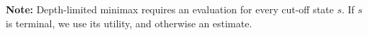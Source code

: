 \documentclass{stex}
\begin{document}


\textbf{Note:} Depth-limited minimax requires an
evaluation for every cut-off state $s$.
If $s$ is terminal, we use its utility, and otherwise an estimate.
\end{document}
